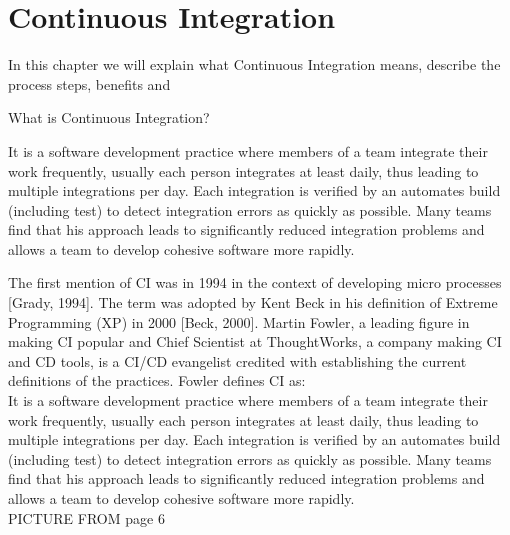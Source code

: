 \chapter{Continuous Integration}
\label{chap:ci}

In this chapter we will explain what Continuous Integration means, describe the process steps, benefits and 

What is Continuous Integration?

It is a software development practice where members of a team integrate their work frequently, usually each person integrates at least daily, thus leading to multiple integrations per day. Each integration is verified by an automates build (including test) to detect integration errors as quickly as possible. Many teams find that his approach leads to significantly reduced integration problems and allows a team to develop cohesive software more rapidly.  \cite{Fowler2006}

\cite{Rejstrom2016}
The first mention of CI was in 1994 in the context of developing micro processes [Grady, 1994]. The term was adopted by Kent Beck in his definition of Extreme Programming (XP) in 2000 [Beck, 2000]. Martin Fowler, a leading figure in making CI popular and Chief Scientist at ThoughtWorks, a company making CI and CD tools, is a CI/CD evangelist credited with establishing the current definitions of the practices. Fowler defines CI as:\\

It is a software development practice where members of a team integrate their work frequently, usually each person integrates at least daily, thus leading to multiple integrations per day. Each integration is verified by an automates build (including test) to detect integration errors as quickly as possible. Many teams find that his approach leads to significantly reduced integration problems and allows a team to develop cohesive software more rapidly.\cite{Fowler2006}\\

PICTURE FROM page 6\\

